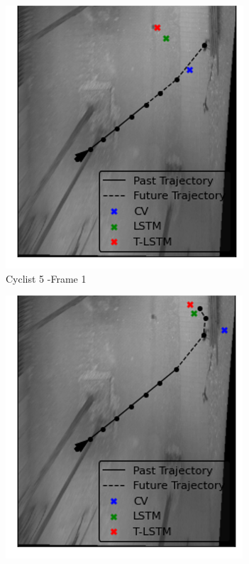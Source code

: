 \documentclass{article}
\begin{document}
\begin{figure}[H]
\centering
\begin{subfigure}{0.4\textwidth}
  \centering
  \includegraphics[width=\linewidth]{quali_results/cyc-5-1.png}
  \caption{Cyclist 5 -Frame 1}
  \label{fig:cyc5-1}
\end{subfigure}
\begin{subfigure}{0.4\textwidth}
  \centering
  \includegraphics[width=\linewidth]{quali_results/cyc-5-2.png}

\end{subfigure}
\end{figure}
\end{document}
